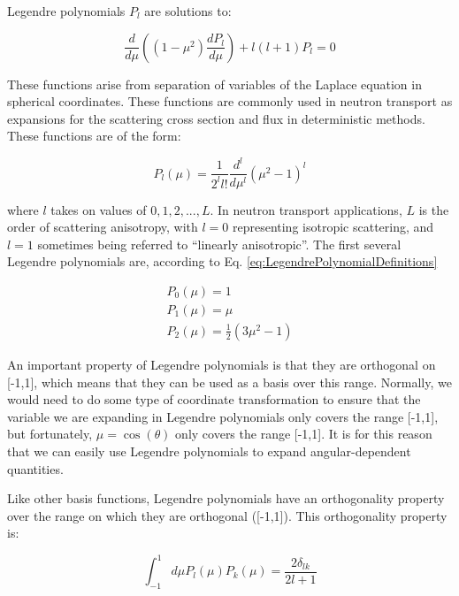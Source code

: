 \documentclass[10pt]{article}
\begin{document}
\begin{flushleft}
Legendre polynomials \(P_l\) are solutions to:

\begin{equation}
\label{eq:LegendrePolynomialDiffEq}
\frac{d}{d\mu} \left((1-\mu^2) \frac{dP_l}{d\mu}\right) + l(l+1)P_l = 0
\end{equation}

These functions arise from separation of variables of the Laplace equation in spherical coordinates. These functions are commonly used in neutron transport as expansions for the scattering cross section and flux in deterministic methods. These functions are of the form:

\begin{equation}
\label{eq:LegendrePolynomialDefinitions}
P_l (\mu) = \frac{1}{2^l l!} \frac{d^l}{d\mu^l} \left(\mu^2 -1\right)^l
\end{equation}

where \(l\) takes on values of \(0, 1, 2, ..., L\). In neutron transport applications, \(L\) is the order of scattering anisotropy, with \(l=0\) representing isotropic scattering, and \(l = 1\) sometimes being referred to ``linearly anisotropic''. The first several Legendre polynomials are, according to Eq. \ref{eq:LegendrePolynomialDefinitions}

\begin{equation}
\label{eqn:LegendrePolynomials_P0P1P2}
\begin{aligned}
 P_0 (\mu) = 1\\
 P_1 (\mu) = \mu\\
 P_2 (\mu) = \frac{1}{2} (3\mu^2 -1)
\end{aligned}
\end{equation}

An important property of Legendre polynomials is that they are orthogonal on [-1,1], which means that they can be used as a basis over this range. Normally, we would need to do some type of coordinate transformation to ensure that the variable we are expanding in Legendre polynomials only covers the range [-1,1], but fortunately, \(\mu = \cos{(\theta)}\) only covers the range [-1,1]. It is for this reason that we can easily use Legendre polynomials to expand angular-dependent quantities. 

Like other basis functions, Legendre polynomials have an orthogonality property over the range on which they are orthogonal ([-1,1]). This orthogonality property is:

\begin{equation}
\label{eqn:LegendrePolynomialsOrthogonality}
\int_{-1}^{1} d\mu P_l (\mu) P_k (\mu) = \frac{2\delta_{lk}}{2l+1}
\end{equation}


\end{flushleft}
\end{document}
